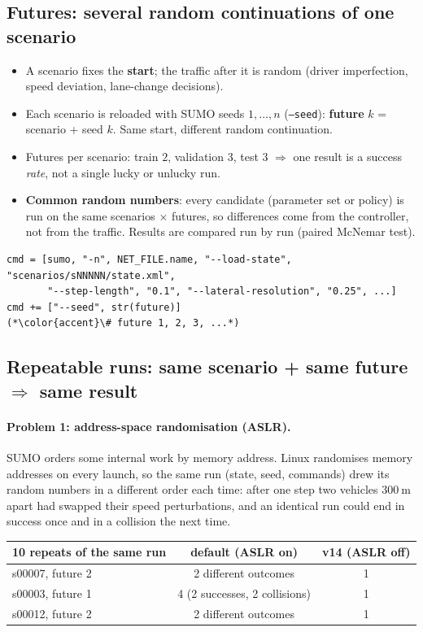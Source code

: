 \documentclass[11pt,a4paper]{article}
\begin{document}
\subsection{Futures: several random continuations of one scenario}
\begin{itemize}
  \item A scenario fixes the \textbf{start}; the traffic after it is random (driver imperfection, speed deviation,
        lane-change decisions).
  \item Each scenario is reloaded with SUMO seeds $1, \dots, n$ (\texttt{--seed}): \textbf{future} $k$ = scenario
        + seed $k$. Same start, different random continuation.
  \item Futures per scenario: train $2$, validation $3$, test $3$ \;$\Rightarrow$\; one result is a success
        \emph{rate}, not a single lucky or unlucky run.
  \item \textbf{Common random numbers}: every candidate (parameter set or policy) is run on the same scenarios
        $\times$ futures, so differences come from the controller, not from the traffic. Results are compared
        run by run (paired McNemar test).
\end{itemize}
\begin{lstlisting}
cmd = [sumo, "-n", NET_FILE.name, "--load-state", "scenarios/sNNNNN/state.xml",
       "--step-length", "0.1", "--lateral-resolution", "0.25", ...]
cmd += ["--seed", str(future)]                       (*\color{accent}\# future 1, 2, 3, ...*)
\end{lstlisting}

\subsection{Repeatable runs: same scenario + same future $\Rightarrow$ same result}
\paragraph{Problem 1: address-space randomisation (ASLR).} SUMO orders some internal work by memory address.
Linux randomises memory addresses on every launch, so the same run (state, seed, commands) drew its random
numbers in a different order each time: after one step two vehicles $300~\mathrm{m}$ apart had swapped their
speed perturbations, and an identical run could end in success once and in a collision the next time.

\begin{center}
\begin{tabular}{lcc}
  \toprule
  10 repeats of the same run & default (ASLR on) & v14 (ASLR off) \\
  \midrule
  s00007, future 2 & 2 different outcomes & 1 \\
  s00003, future 1 & 4 (2 successes, 2 collisions) & 1 \\
  s00012, future 2 & 2 different outcomes & 1 \\
  \bottomrule
\end{tabular}
\end{center}
\end{document}
